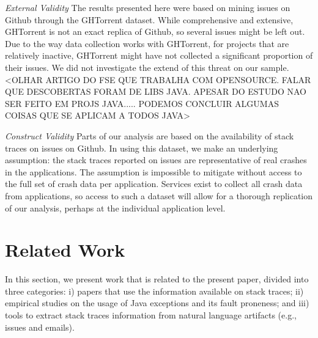\documentclass[conference]{IEEEtran}
\begin{document}
\noindent\emph{External Validity} The results presented here were based on mining
issues on Github through the GHTorrent dataset. While comprehensive and
extensive, GHTorrent is not an exact replica of Github, so several issues might
be left out. Due to the way data collection works with GHTorrent, for projects
that are relatively inactive, GHTorrent might have not collected a significant
proportion of their issues. We did not investigate the extend of this threat on
our sample.
<OLHAR ARTIGO DO FSE QUE TRABALHA COM OPENSOURCE.
FALAR QUE DESCOBERTAS FORAM DE LIBS JAVA. APESAR DO ESTUDO NAO SER FEITO EM PROJS JAVA.....
PODEMOS CONCLUIR ALGUMAS COISAS QUE SE APLICAM A TODOS JAVA>

\noindent\emph{Construct Validity} Parts of our analysis are based on the availability of stack traces on issues on
Github. In using this dataset, we make an underlying assumption: the
stack traces reported on issues are representative of real crashes in
the applications. The assumption is impossible to mitigate without access to
the full set of crash data per application. Services exist to collect all
crash data from applications, so access to such a dataset will allow for
a thorough replication of our analysis, perhaps at the individual application
level.

\section{Related Work}

In this section, we present work that is related to the present paper, divided into
three categories: i) papers that use the information available on stack traces;
ii) empirical studies on the usage of Java exceptions and its fault proneness;
and iii) tools to extract stack traces information from natural language artifacts
(e.g., issues and emails).
\end{document}
